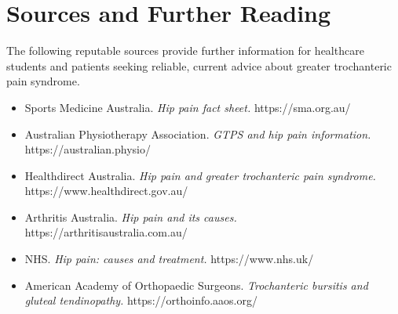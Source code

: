 \section*{Sources and Further Reading}
The following reputable sources provide further information for healthcare students and patients seeking reliable, current advice about greater trochanteric pain syndrome.

\begin{itemize}
    \item Sports Medicine Australia. \textit{Hip pain fact sheet.} https://sma.org.au/
    \item Australian Physiotherapy Association. \textit{GTPS and hip pain information.} https://australian.physio/
    \item Healthdirect Australia. \textit{Hip pain and greater trochanteric pain syndrome.} https://www.healthdirect.gov.au/
    \item Arthritis Australia. \textit{Hip pain and its causes.} https://arthritisaustralia.com.au/
    \item NHS. \textit{Hip pain: causes and treatment.} https://www.nhs.uk/
    \item American Academy of Orthopaedic Surgeons. \textit{Trochanteric bursitis and gluteal tendinopathy.} https://orthoinfo.aaos.org/
\end{itemize}
